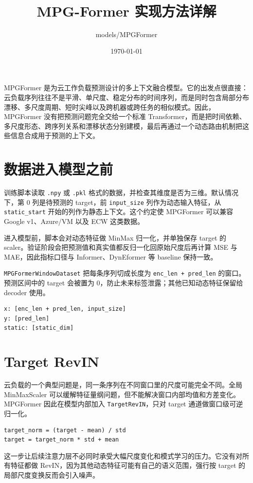 \documentclass[UTF8,a4paper,11pt]{ctexart}
\title{MPG-Former 实现方法详解}
\author{models/MPGFormer}
\date{\today}
\begin{document}
\maketitle

MPGFormer 是为云工作负载预测设计的多上下文融合模型。它的出发点很直接：云负载序列往往不是平滑、单尺度、稳定分布的时间序列，而是同时包含局部分布漂移、多尺度周期、短时尖峰以及跨机器或跨任务的相似模式。因此，MPGFormer 没有把预测问题完全交给一个标准 Transformer，而是把时间依赖、多尺度形态、跨序列关系和漂移状态分别建模，最后再通过一个动态路由机制把这些信息合成用于预测的上下文。

\section{数据进入模型之前}

训练脚本读取 \verb|.npy| 或 \verb|.pkl| 格式的数据，并检查其维度是否为三维。默认情况下，第 0 列是待预测的 target，前 \verb|input_size| 列作为动态输入特征，从 \verb|static_start| 开始的列作为静态上下文。这个约定使 MPGFormer 可以兼容 Google v1、Azure/VM 以及 ECW 这类数据。

进入模型前，脚本会对动态特征做 MinMax 归一化，并单独保存 target 的 scaler。验证阶段会把预测值和真实值都反归一化回原始尺度后再计算 MSE 与 MAE，因此指标口径与 Informer、DynEformer 等 baseline 保持一致。

\verb|MPGFormerWindowDataset| 把每条序列切成长度为 \verb|enc_len + pred_len| 的窗口。预测区间中的 target 会被置为 0，防止未来标签泄露；其他已知动态特征保留给 decoder 使用。

\begin{lstlisting}
x: [enc_len + pred_len, input_size]
y: [pred_len]
static: [static_dim]
\end{lstlisting}

\section{Target RevIN}

云负载的一个典型问题是，同一条序列在不同窗口里的尺度可能完全不同。全局 MinMaxScaler 可以缓解特征量纲问题，但不能解决窗口内部均值和方差变化。MPGFormer 因此在模型内部加入 \verb|TargetRevIN|，只对 target 通道做窗口级可逆归一化。

\begin{lstlisting}
target_norm = (target - mean) / std
target = target_norm * std + mean
\end{lstlisting}

这一步让后续注意力层不必同时承受大幅尺度变化和模式学习的压力。它没有对所有特征都做 RevIN，因为其他动态特征可能有自己的语义范围，强行按 target 的局部尺度变换反而会引入噪声。
\end{document}
